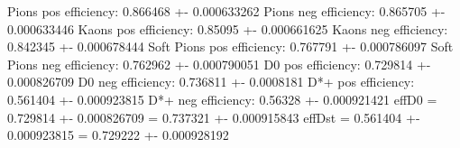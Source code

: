 Pions pos efficiency: 0.866468 +- 0.000633262
Pions neg efficiency: 0.865705 +- 0.000633446
Kaons pos efficiency: 0.85095 +- 0.000661625
Kaons neg efficiency: 0.842345 +- 0.000678444
Soft Pions pos efficiency: 0.767791 +- 0.000786097
Soft Pions neg efficiency: 0.762962 +- 0.000790051
D0 pos efficiency: 0.729814 +- 0.000826709
D0 neg efficiency: 0.736811 +- 0.0008181
D*+ pos efficiency: 0.561404 +- 0.000923815
D*+ neg efficiency: 0.56328 +- 0.000921421
effD0 = 0.729814 +- 0.000826709 = 0.737321 +- 0.000915843
effDst = 0.561404 +- 0.000923815 = 0.729222 +- 0.000928192
